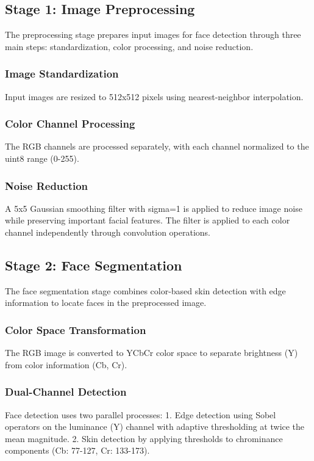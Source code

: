 \documentclass[12pt,a4paper]{article}
\begin{document}
\subsection{Stage 1: Image Preprocessing}
The preprocessing stage prepares input images for face detection through three main steps: standardization, color processing, and noise reduction.

\subsubsection{Image Standardization}
Input images are resized to 512x512 pixels using nearest-neighbor interpolation.

\subsubsection{Color Channel Processing}
The RGB channels are processed separately, with each channel normalized to the uint8 range (0-255).

\subsubsection{Noise Reduction}
A 5x5 Gaussian smoothing filter with sigma=1 is applied to reduce image noise while preserving important facial features. The filter is applied to each color channel independently through convolution operations.

\subsection{Stage 2: Face Segmentation}
The face segmentation stage combines color-based skin detection with edge information to locate faces in the preprocessed image.

\subsubsection{Color Space Transformation}
The RGB image is converted to YCbCr color space to separate brightness (Y) from color information (Cb, Cr).

\subsubsection{Dual-Channel Detection}
Face detection uses two parallel processes:
1. Edge detection using Sobel operators on the luminance (Y) channel with adaptive thresholding at twice the mean magnitude.
2. Skin detection by applying thresholds to chrominance components (Cb: 77-127, Cr: 133-173).
\end{document}
